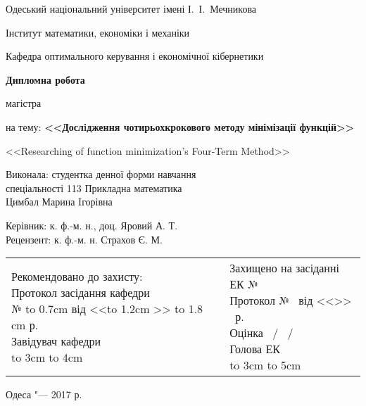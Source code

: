 \thispagestyle{empty}

\begin{center}
Одеський національний університет імені І.~І.~Мечникова

Інститут математики, економіки і механіки

Кафедра оптимального керування і економічної кібернетики
\end{center}

\vspace{2.5cm}

\begin{center}
\large
\textbf{Дипломна робота}

магістра

\bigskip

на тему: \textbf{<<Дослiдження чотирьохкрокового методу мінімізації функцій>>}

\bigskip

\small{<<Researching of function minimization's Four-Term Method>>}
\end{center}

\vfill

\hfill
\begin{minipage}{0.6\textwidth}
Виконала: студентка денної форми навчання\\
спеціальності 113 Прикладна математика\\
Цимбал Марина Iгорівна

\medskip

Керівник: к. ф.-м. н., доц. Яровий А. Т.\\
Рецензент: к. ф.-м. н. Страхов Є. М.
\end{minipage}

\vfill

\begin{flushleft}
\begin{tabular}{p{5cm}p{2.5cm}p{8cm}}
\makecell[l]{Рекомендовано до захисту:\\
Протокол засідання кафедри\\
№ \hbox to 0.7cm {\hrulefill} від <<\hbox to 1.2cm {\hrulefill}>> \hbox to 1.8 cm {\hrulefill} р.\\
Завідувач кафедри\\
\hbox to 3cm {\hrulefill} \hbox to 4cm{\hrulefill}
} & & \makecell[l]{Захищено на засіданні ЕК № \hrulefill \\
Протокол № \hrulefill\ від <<\hrulefill>> \hrulefill\ р.\\
Оцінка \hrulefill\ / \hrulefill\ / \hrulefill\ \\
Голова ЕК\\
\hbox to 3cm {\hrulefill} \hbox to 5cm{\hrulefill}}
\end{tabular}
\end{flushleft}


\vfill

\begin{center}
Одеса "--- 2017 р.
\end{center}

